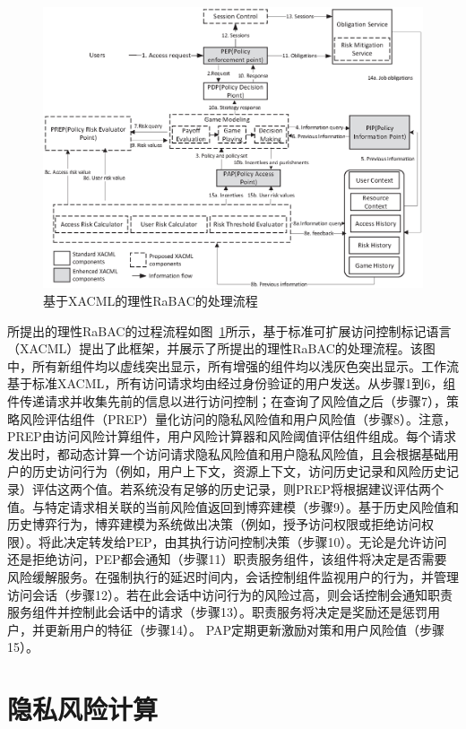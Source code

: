\begin{figure}[htb]
	\centering
	\includegraphics[width=1\textwidth]{./figures/game-rbac-workflow.eps}
	\caption{基于XACML的理性RaBAC的处理流程}\label{fig:game-rbac-workflow}
\end{figure}


所提出的理性RaBAC的过程流程如图~\ref{fig:game-rbac-workflow}所示，基于标准可扩展访问控制标记语言（XACML）提出了此框架，并展示了所提出的理性RaBAC的处理流程。该图中，所有新组件均以虚线突出显示，所有增强的组件均以浅灰色突出显示。工作流基于标准XACML，所有访问请求均由经过身份验证的用户发送。从步骤1到6，组件传递请求并收集先前的信息以进行访问控制；在查询了风险值之后（步骤7），策略风险评估组件（PREP）量化访问的隐私风险值和用户风险值（步骤8）。注意，PREP由访问风险计算组件，用户风险计算器和风险阈值评估组件组成。每个请求发出时，都动态计算一个访问请求隐私风险值和用户隐私风险值，且会根据基础用户的历史访问行为（例如，用户上下文，资源上下文，访问历史记录和风险历史记录）评估这两个值。若系统没有足够的历史记录，则PREP将根据建议评估两个值。与特定请求相关联的当前风险值返回到博弈建模（步骤9）。基于历史风险值和历史博弈行为，博弈建模为系统做出决策（例如，授予访问权限或拒绝访问权限）。将此决定转发给PEP，由其执行访问控制决策（步骤10）。无论是允许访问还是拒绝访问，PEP都会通知（步骤11）职责服务组件，该组件将决定是否需要风险缓解服务。在强制执行的延迟时间内，会话控制组件监视用户的行为，并管理访问会话（步骤12）。若在此会话中访问行为的风险过高，则会话控制会通知职责服务组件并控制此会话中的请求（步骤13）。职责服务将决定是奖励还是惩罚用户，并更新用户的特征（步骤14）。 PAP定期更新激励对策和用户风险值（步骤15）。

\section{隐私风险计算}
\label{sec:riskvalue}

